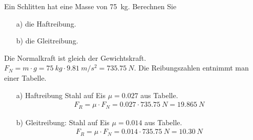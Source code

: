 
\begin{aufgabe}
	Ein Schlitten hat eine Masse von \SI{75}{kg}.
	Berechnen Sie
	\begin{itemize}
		\item [a)] die Haftreibung.
		\item [b)] die Gleitreibung.
	\end{itemize}

	
	\begin{loesung}
		Die Normalkraft ist gleich der Gewichtskraft. $F_N=m\cdot g=\SI{75}{kg}\cdot\SI{9.81}{m/s^2}=\SI{735.75}{N}$.
		Die Reibungszahlen entnimmt man einer Tabelle.
		\begin{itemize}
			\item[a)] Haftreibung Stahl auf Eis $\mu= 0.027$ aus Tabelle.%
				\begin{eqnarray*}
					F_R=\mu\cdot F_N= \num{0.027}\cdot\SI{735.75}{N}=\SI{19.865}{N}
				\end{eqnarray*}
			\item[b)] Gleitreibung: Stahl auf Eis $\mu= 0.014$ aus Tabelle.%
				\begin{eqnarray*}
					F_R=\mu\cdot F_N=\num{0.014}\cdot\SI{735.75}{N}=\SI{10.30}{N}
				\end{eqnarray*}
		\end{itemize}
	\end{loesung}
\end{aufgabe}
